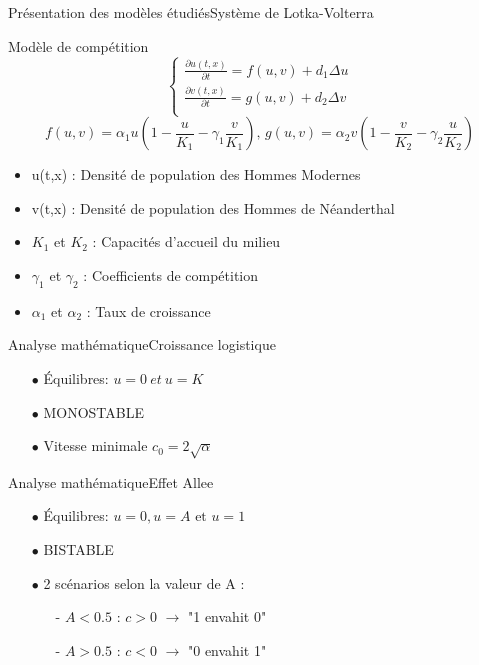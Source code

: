 \documentclass[10pt]{beamer}
\begin{document}
\begin{frame}{Présentation des modèles étudiés}{Système de Lotka-Volterra}
\begin{block}{Modèle de compétition}
	$$\begin{cases} \frac{\partial u(t,x)}{\partial t} = f(u,v) + d_1\Delta u\\ \frac{\partial v(t,x)}{\partial t} = g(u,v) + d_2 \Delta v \\ 
\end{cases}$$
	$$f(u,v) = \alpha_1 u\left(1-\frac{u}{K_1}-\gamma_1\frac{v}{K_1}\right) \text{, } g(u,v) = \alpha_2 v\left(1-\frac{v}{K_2}-\gamma_2\frac{u}{K_2}\right)$$
\end{block}
\begin{itemize}
	\item u(t,x) : Densité de population des Hommes Modernes 
    \item v(t,x) : Densité de population des Hommes de Néanderthal 
    \item $K_1$ et $K_2$ : Capacités d'accueil du milieu
    \item $\gamma_1$ et $\gamma_2$ : Coefficients de compétition
    \item $\alpha_1$ et $\alpha_2$ : Taux de croissance
\end{itemize}
\end{frame}

\begin{frame}{Analyse mathématique}{Croissance logistique}
\begin{itemize}
	\item[$\bullet$] Équilibres: $u=0 {\ et\ } u=K$
	\item[$\bullet$] MONOSTABLE
	\item[$\bullet$] Vitesse minimale $c_0=2\sqrt{\alpha}$
\end{itemize}
\end{frame}

\begin{frame}{Analyse mathématique}{Effet Allee}
\begin{itemize}
	\item[$\bullet$] Équilibres: $u=0, u=A \text{ et } u=1$
	\item[$\bullet$] BISTABLE
	\item[$\bullet$] 2 scénarios selon la valeur de A :
	\begin{itemize}
		\item[-] $A<0.5$ : $c>0$ $\rightarrow$ "1 envahit 0"
		\item[-] $A>0.5$ : $c<0$ $\rightarrow$ "0 envahit 1"
	\end{itemize}
\end{itemize}
\end{frame}
\end{document}
